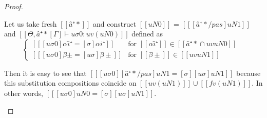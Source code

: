 \begin{proof}
\begin{caseof}
\begin{enumerate}
\begin{enumerate}
                            Let us take fresh $[[â⁺*]]$ and 
                            construct $[[uN0]]$ = $[[ [â⁺*/pas]uN1 ]]$
                            and $[[Θ, â⁺*[Γ] ⊢ uσ0 : uv(uN0)]]$ defined as
                            $$
                            \begin{cases}
                                [[ [uσ0]αî⁺ = [σ]αi⁺ ]] & \text{for $[[αî⁺]] \in  [[{â⁺*} ∩ uv uN0]]$ }\\
                                [[ [uσ0]β̂± = [uσ]β̂± ]] & \text{for $[[β̂±]] \in [[uv uN1]]$}
                            \end{cases}
                            $$

                            Then it is easy to see that $[[ [uσ0][â⁺*/pas]uN1 = [σ][uσ]uN1 ]]$
                            because this substitution compositions coincide on
                            $[[uv(uN1)]] \cup [[fv(uN1)]]$. 
                            In other words, $[[ [uσ0]uN0 = [σ][uσ]uN1 ]]$.


\end{enumerate}
\end{enumerate}
\end{caseof}
\end{proof}
